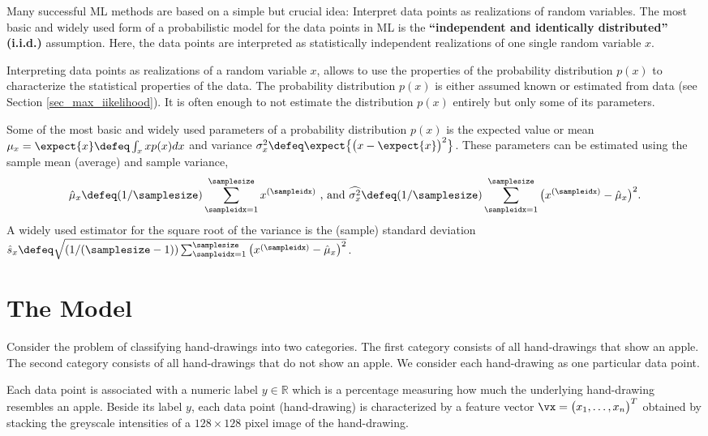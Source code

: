 \documentclass[12pt]{report}
\begin{document}
Many successful ML methods are based on a simple but crucial idea: Interpret data points 
as realizations of random variables. The most basic and widely used form of a probabilistic 
model for the data points in ML is the {\bf ``independent and identically distributed'' (i.i.d.)} 
assumption. Here, the data points are interpreted as statistically independent realizations of 
one single random variable $x$.

Interpreting data points as realizations of a random variable $x$, allows to 
use the properties of the probability distribution $p(x)$ to characterize the statistical 
properties of the data. The probability distribution $p(x)$ is either assumed 
known or estimated from data (see Section \ref{sec_max_iikelihood}). It is often 
enough to not estimate the distribution $p(x)$ entirely but only some of its parameters. 

Some of the most basic and widely used parameters of a probability distribution $p(x)$ 
is the expected value or mean $\mu_{x} = \expect\{x\} \defeq \int_{x} x p(x) dx$ and variance 
$\sigma_{x}^{2} \defeq \expect\big\{\big(x-\expect\{x\}\big)^{2}\big\}$. These parameters 
can be estimated using the sample mean (average) and sample variance, 
\begin{equation} 
\hat{\mu}_{x} \defeq (1/\samplesize) \sum_{\sampleidx=1}^{\samplesize} x^{(\sampleidx)}\mbox{ , and } \widehat{\sigma^{2}_{x}} \defeq (1/\samplesize) \sum_{\sampleidx=1}^{\samplesize} \big( x^{(\sampleidx)} - \hat{\mu}_{x} \big)^{2}.  
\end{equation} 
A widely used estimator for the square root of the variance is the 
(sample) standard deviation $\hat{s}_{x} \defeq  \sqrt{(1/(\samplesize-1)) \sum_{\sampleidx=1}^{\samplesize} \big( x^{(\sampleidx)} - \hat{\mu}_{x} \big)^{2}}$. 




\section{The Model}
\label{sec_hypo_space}

Consider the problem of classifying hand-drawings into two categories. 
The first category consists of all hand-drawings that show an apple. 
The second category consists of all hand-drawings that do not show 
an apple. We consider each hand-drawing as one particular data point. 

Each data point is associated with a numeric label $y \in \mathbb{R}$ 
which is a percentage measuring how much the underlying hand-drawing 
resembles an apple. Beside its label $y$, each data point (hand-drawing) 
is characterized by a feature vector $\vx=\big(x_{1},\ldots,x_{n}\big)^{T}$ 
obtained by stacking the greyscale intensities of a $128 \times 128$ 
pixel image of the hand-drawing.  
\end{document}
